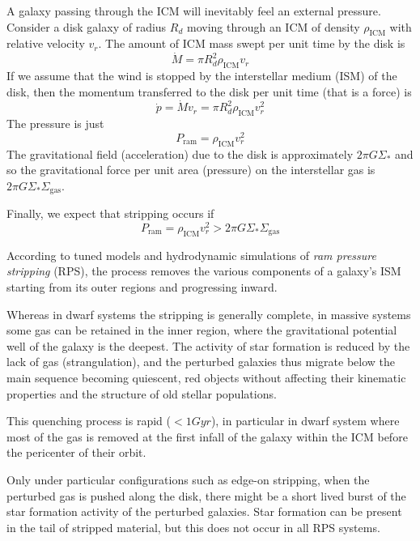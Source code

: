 A galaxy passing through the ICM will inevitably feel an external pressure. Consider a disk galaxy of radius $R_{d}$ moving through an ICM of density $\rho_{\text{ICM}}$ with relative velocity $v_{r}$. The amount of ICM mass swept per unit time by the disk is
\begin{equation*}
    \dot{M} = \pi R_{d}^{2}\rho_{\text{ICM}}v_{r}
\end{equation*}
If we assume that the wind is stopped by the interstellar medium (ISM) of the disk, then the momentum transferred to the disk per unit time (that is a force) is
\begin{equation*}
    \dot{p} = \dot{M}v_{r} =  \pi R_{d}^{2}\rho_{\text{ICM}}v_{r}^{2}
\end{equation*}
The pressure is just 
\begin{equation*}
    P_{\text{ram}} = \rho_{\text{ICM}}v_{r}^{2}
\end{equation*}
The gravitational field (acceleration) due to the disk is approximately $2\pi G \Sigma_{*}$ and so the gravitational force per unit area (pressure) on the interstellar gas is $2\pi G \Sigma_{*}\Sigma_{\text{gas}}$.
\par Finally, we expect that stripping occurs if
\begin{equation}
    P_{\text{ram}} = \rho_{\text{ICM}}v_{r}^{2} > 2\pi G \Sigma_{*}\Sigma_{\text{gas}}
    \label{eq:rps}
\end{equation}
\par According to tuned models and hydrodynamic simulations of \emph{ram pressure stripping} (RPS), the process removes the various components of a galaxy’s ISM starting from its outer regions and progressing inward.
\par Whereas in dwarf systems the stripping is generally complete, in massive systems some gas can be retained in the inner region, where the gravitational potential well of the galaxy is the deepest. The activity of star formation is reduced by the lack of gas (strangulation), and the perturbed galaxies thus migrate below the main sequence becoming quiescent, red objects without affecting their kinematic properties and the structure of old stellar populations.
\par This quenching process is rapid ($<1\unit{Gyr}$), in particular in dwarf system where most of the gas is removed at the first infall of the galaxy within the ICM before the pericenter of their orbit.
\par Only under particular configurations such as edge-on stripping, when the perturbed gas is pushed along the disk, there might be a short lived burst of the star formation activity of the perturbed galaxies. Star formation can be present in the tail of stripped material, but this does not occur in all RPS systems.

